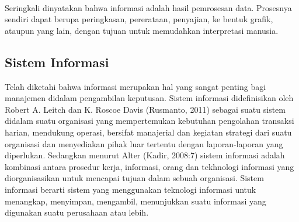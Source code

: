 \documentclass{jtetiproposalskripsi}
\begin{document}
\paragraph{}
Seringkali dinyatakan bahwa informasi adalah hasil pemrosesan data. Prosesnya sendiri dapat berupa peringkasan, pererataan, penyajian, ke bentuk grafik, ataupun yang lain, dengan tujuan untuk memudahkan interpretasi manusia.

\subsection{Sistem Informasi}
Telah diketahi bahwa informasi merupakan hal yang sangat penting bagi manajemen didalam pengambilan keputusan. Sistem informasi didefinisikan oleh Robert A. Leitch dan K. Roscoe Davis (Rusmanto, 2011) sebagai suatu sistem didalam suatu organisasi yang mempertemukan kebutuhan pengolahan transaksi harian, mendukung operasi, bersifat manajerial dan kegiatan strategi dari suatu organisasi dan menyediakan pihak luar tertentu dengan laporan-laporan yang diperlukan. Sedangkan menurut Alter (Kadir, 2008:7) sistem informasi adalah kombinasi antara prosedur kerja, informasi, orang dan tekhnologi informasi yang diorganisasikan untuk mencapai tujuan dalam sebuah organisasi. Sistem informasi berarti sistem yang menggunakan teknologi informasi untuk menangkap, menyimpan, mengambil, menunjukkan suatu informasi yang digunakan suatu perusahaan atau lebih.
\end{document}
